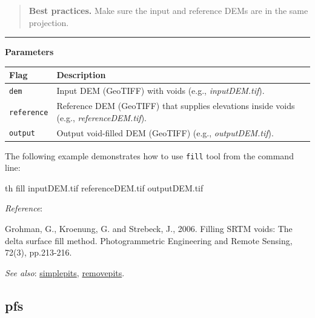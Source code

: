 \documentclass[
]{book}
\newenvironment{Shaded}{\begin{snugshade}}{\end{snugshade}}
\newcommand{\ExtensionTok}[1]{#1}
\newcommand{\NormalTok}[1]{#1}
\begin{document}
\begin{quote}
\textbf{Best practices.} Make sure the input and reference DEMs are in the same projection.
\end{quote}

\begin{center}\rule{0.5\linewidth}{0.5pt}\end{center}

\textbf{Parameters}

\begin{longtable}[]{@{}
  >{\raggedright\arraybackslash}p{}
  >{\raggedright\arraybackslash}p{}@{}}
\toprule\noalign{}
\begin{minipage}[b]{\linewidth}\raggedright
Flag
\end{minipage} & \begin{minipage}[b]{\linewidth}\raggedright
Description
\end{minipage} \\
\midrule\noalign{}
\endhead
\bottomrule\noalign{}
\endlastfoot
\texttt{dem} & Input DEM (GeoTIFF) with voids (e.g., \emph{inputDEM.tif}). \\
\texttt{reference} & Reference DEM (GeoTIFF) that supplies elevations inside voids (e.g., \emph{referenceDEM.tif}). \\
\texttt{output} & Output void-filled DEM (GeoTIFF) (e.g., \emph{outputDEM.tif}). \\
\end{longtable}

The following example demonstrates how to use \texttt{fill} tool from the command line:

\begin{Shaded}
\begin{Highlighting}[]
\ExtensionTok{th}\NormalTok{ fill inputDEM.tif referenceDEM.tif outputDEM.tif}
\end{Highlighting}
\end{Shaded}

\emph{Reference}:

Grohman, G., Kroenung, G. and Strebeck, J., 2006. Filling SRTM voids: The delta surface fill method. Photogrammetric Engineering and Remote Sensing, 72(3), pp.213-216.

\emph{See also}: \hyperref[simplepits]{simplepits}, \hyperref[removepits]{removepits}.

\subsection{pfs}\label{pfs}
\end{document}
